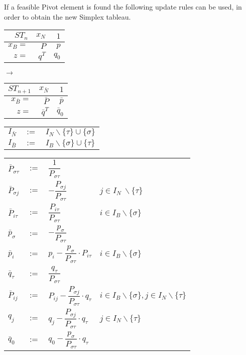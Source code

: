 \documentclass[a4paper, 11pt]{article}
\makeatletter
\renewenvironment{quotation}
{\list{}{\listparindent=1.5em
		\itemindent=0pt
		\parsep\z@ \@plus\p@}%
	\item\relax}
{\endlist}
\makeatother
\begin{document}
If a feasible Pivot element is found the following update rules can be used, in order to obtain the new Simplex tableau. \\
\begin{quotation}
	\begingroup
	\def\arraystretch{1.5}
	\begin{tabular}{r|r|r}
		$ST_n$&$x_N$&$1$\\
		\hline
		$x_B=$&$P$&$p$\\
		\hline
		$z=$&$q^T$&$q_0$
	\end{tabular}
	$\longrightarrow$
	\begin{tabular}{r|r|r}
		$ST_{n+1}$&$x_{\bar{N}}$&$1$\\
		\hline
		$x_{\bar{B}}=$&$\bar{P}$&$\bar{p}$\\
		\hline
		$z=$&$\bar{q}^T$&$\bar{q}_0$
	\end{tabular}
	\endgroup
\end{quotation}

\begin{quotation}
	\begingroup
	\def\arraystretch{1.5}
	\begin{tabular}{lrl}
		$I_{\bar{N}} $&$:=$&$ I_N \backslash\{ \tau \} \cup \{ \sigma \}$\\
		$I_{\bar{B}} $&$:=$&$ I_B \backslash\{ \sigma \} \cup \{ \tau \}$
	\end{tabular}
	\endgroup
\end{quotation}

\begin{quotation}
	\begingroup
	\def\arraystretch{2}
	\begin{tabular}{lrll}
		$ \bar{P}_{\sigma\tau}$&$:=$&$\dfrac{1}{P_{\sigma\tau}} $&\vspace{0.1cm}\\
		$\bar{P}_{\sigma j}$&$:=$&$ -\dfrac{P_{\sigma j}}{P_{\sigma\tau}}$& $ j\in I_N\ \backslash\{\tau\}$\vspace{0.1cm}\\
		$ \bar{P}_{i\tau}$&$ :=$ & $ \dfrac{P_{i\tau}}{P_{\sigma\tau}} $&$ i\in I_B\backslash \{\sigma\}$\\
		$ \bar{p}_\sigma $&$:=$&$ -\dfrac{p_\sigma}{P_{\sigma\tau}} $&\\
		$ \bar{p}_i $&$:=$&$ p_i - \dfrac{p_\sigma}{P_{\sigma\tau}}\cdot P_{i\tau}$&$i\in I_B\backslash\{ \sigma \}$\\
		$ \bar{q}_\tau $&$:=$&$ \dfrac{q_\tau}{P_{\sigma\tau}} $&\\
		$ \bar{P}_{ij} $&$ := $&$ P_{ij} - \dfrac{P_{\sigma j}}{P_{\sigma\tau}}\cdot q_\tau$&$ i\in I_B\backslash \{\sigma\}, j\in I_N\backslash\{\tau\} $\\
		$ q_j $&$ := $&$ q_j - \dfrac{P_{\sigma j}}{P_{\sigma\tau}}\cdot q_\tau $& $ j\in I_N\backslash\{\tau\} $\\
		$ \bar{q}_0 $&$:=$&$ q_0 - \dfrac{p_\sigma}{P_{\sigma\tau}}\cdot q_\tau $ 
	\end{tabular}
	\endgroup
\end{quotation}
\end{document}
